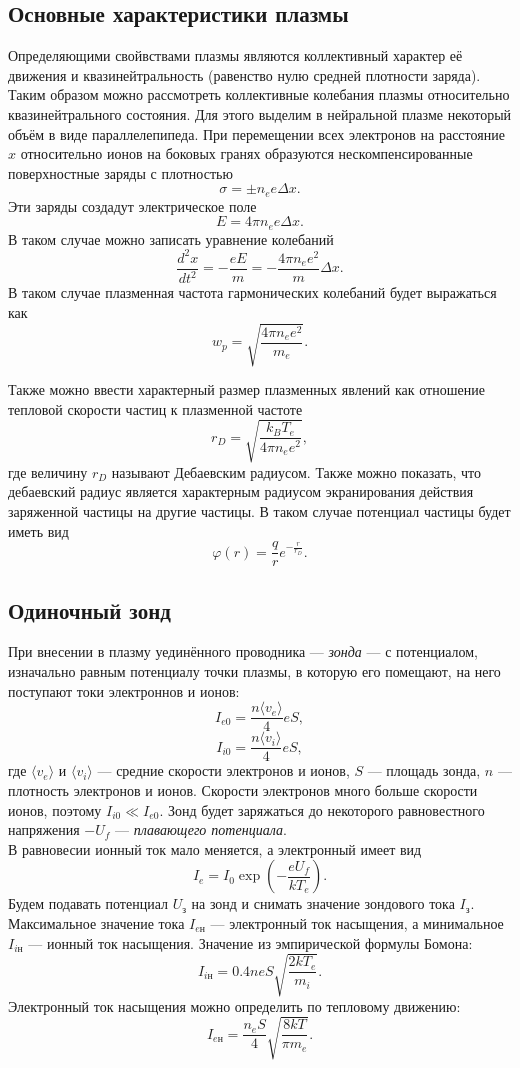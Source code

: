 \documentclass[12pt]{article}
\begin{document}
\subsection*{Основные характеристики плазмы}
Определяющими свойвствами плазмы являются коллективный характер её движения и квазинейтральность (равенство нулю средней плотности заряда).
Таким образом можно рассмотреть коллективные колебания плазмы относительно квазинейтрального состояния.
Для этого выделим в нейральной плазме некоторый объём в виде параллелепипеда.
При перемещении всех электронов на расстояние $x$ относительно ионов на боковых гранях образуются нескомпенсированные
поверхностные заряды с плотностью
\[
	\sigma = \pm n_e e \Delta x.
\]
Эти заряды создадут электрическое поле
\[
	E = 4\pi n_e e \Delta x .
\]
В таком случае можно записать уравнение колебаний
\[
	\frac{d^2 x}{dt^2} = -\frac{eE}{m} = -\frac{4\pi n_e e^2}{m} \Delta x .
\]
В таком случае плазменная частота гармонических колебаний будет выражаться как
\begin{equation}
	w_p = \sqrt{\frac{4\pi n_e e^2}{m_e}}.
	\label{eq:1}
\end{equation}

Также можно ввести характерный размер плазменных явлений как отношение тепловой скорости частиц к плазменной частоте
\begin{equation}
	r_D = \sqrt{\frac{k_B T_e}{4\pi n_e e^2}},
	\label{eq:2}
\end{equation}
где величину $r_D$ называют Дебаевским радиусом. Также можно показать, что дебаевский радиус является характерным радиусом экранирования
действия заряженной частицы на другие частицы. В таком случае потенциал частицы будет иметь вид
\[
	\varphi(r) = \frac{q}{r} e^{-\frac{r}{r_D}}.
\]
\subsection*{Одиночный зонд}
При внесении в плазму уединённого проводника --- \textit{зонда} --- с потенциалом, изначально равным потенциалу точки плазмы, в которую его помещают, на него поступают токи электроннов и ионов:
\[
	I_{e0} = \dfrac{n \langle v_e \rangle}{4}eS,
\]
\[
	I_{i0} = \dfrac{n \langle v_i \rangle}{4}eS,
\]
где $\langle v_e \rangle$ и $\langle v_i \rangle$ --- средние скорости электронов и ионов,
$S$ --- площадь зонда, $n$ --- плотность электронов и ионов.
Скорости электронов много больше скорости ионов,
поэтому $I_{i0} \ll I_{e0}$.
Зонд будет заряжаться до некоторого равновестного
напряжения $-U_f$ --- \textit{плавающего потенциала}.\\
В равновесии ионный ток мало меняется, а электронный имеет вид
$$
	I_e = I_0 \exp\left( -\dfrac{eU_f}{kT_e} \right).
$$
Будем подавать потенциал $U_\text{з}$ на зонд и снимать значение зондового тока $I_\text{з}$.
Максимальное значение тока $I_{e\text{н}}$ --- электронный ток насыщения, а минимальное $I_{i\text{н}}$ --- ионный ток насыщения. Значение из эмпирической формулы Бомона:
\[
	I_{i\text{н}} = 0.4 neS \sqrt{\dfrac{2kT_e}{m_i}}.
\]
Электронный ток насыщения можно определить по тепловому движению:
\[
	I_{e\text{н}} = \frac{n_eS}{4}\sqrt{\frac{8kT}{\pi m_e}}.
\]
\end{document}
